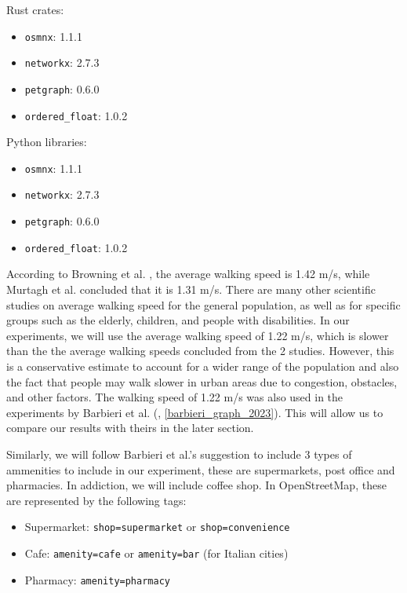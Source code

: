Rust crates:
\begin{itemize}
    \item \verb|osmnx|: 1.1.1
    \item \verb|networkx|: 2.7.3
    \item \verb|petgraph|: 0.6.0
    \item \verb|ordered_float|: 1.0.2
\end{itemize}


Python libraries:
\begin{itemize}
    \item \verb|osmnx|: 1.1.1
    \item \verb|networkx|: 2.7.3
    \item \verb|petgraph|: 0.6.0
    \item \verb|ordered_float|: 1.0.2
\end{itemize}

According to Browning et al. \cite{browning_effects_2006}, the average walking speed is 1.42 m/s, while Murtagh et al. \cite{murtagh_outdoor_2021} concluded that it is 1.31 m/s. There are many other scientific studies on average walking speed for the general population, as well as for specific groups such as the elderly, children, and people with disabilities. In our experiments, we will use the average walking speed of 1.22 m/s, which is slower than the the average walking speeds concluded from the 2 studies. However, this is a conservative estimate to account for a wider range of the population and also the fact that people may walk slower in urban areas due to congestion, obstacles, and other factors. The walking speed of 1.22 m/s was also used in the experiments by Barbieri et al. (\cite{barbieri_graph_2023}, \ref{barbieri_graph_2023}). This will allow us to compare our results with theirs in the later section.

Similarly, we will follow Barbieri et al.'s suggestion to include 3 types of ammenities to include in our experiment, these are supermarkets, post office and pharmacies. In addiction, we will include coffee shop. In OpenStreetMap, these are represented by the following tags:

\begin{itemize}
    \item Supermarket: \verb|shop=supermarket| or \verb|shop=convenience|
    \item Cafe: \verb|amenity=cafe| or \verb|amenity=bar| (for Italian cities)
    \item Pharmacy: \verb|amenity=pharmacy|
\end{itemize}

